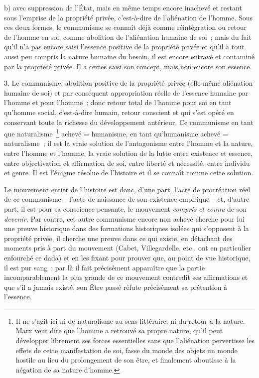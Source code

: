 \documentclass[french,twoside]{book} %
\begin{document}
b) avec suppression de l’État, mais en même temps encore inachevé et restant sous l’emprise de la propriété privée, c’est-à-dire de l’aliénation de l’homme. Sous ces deux formes, le communisme se connaît déjà comme réintégration ou retour de l’homme en soi, comme abolition de l’aliénation humaine de soi ; mais du fait qu’il n’a pas encore saisi l’essence positive de la propriété privée et qu’il a tout aussi peu compris la nature humaine du besoin, il est encore entravé et contaminé par la propriété privée. Il a certes saisi son concept, mais non encore son essence.\par
3. Le communisme, abolition positive de la propriété privée (elle-même aliénation humaine de soi) et par conséquent appropriation réelle de l’essence humaine par l’homme et pour l’homme ; donc retour total de l’homme pour soi en tant qu’homme social, c’est-à-dire humain, retour conscient et qui s’est opéré en conservant toute la richesse du développement antérieur. Ce communisme en tant que naturalisme \footnote{Il ne s’agit ici ni de naturalisme au sens littéraire, ni du retour à la nature. Marx veut dire que l’homme a retrouvé sa propre nature, qu’il peut développer librement ses forces essentielles sans que l’aliénation pervertisse les effets de cette manifestation de soi, fasse du monde des objets un monde hostile au lieu du prolongement de son être, et finalement aboutisse à la négation de sa nature d’homme.} achevé = humanisme, en tant qu’humanisme achevé = naturalisme ; il est la vraie solution de l’antagonisme entre l’homme et la nature, entre l’homme et l’homme, la vraie solution de la lutte entre existence et essence, entre objectivation et affirmation de soi, entre liberté et nécessité, entre individu et genre. Il est l’énigme résolue de l’histoire et il se connaît comme cette solution.\par
[V] Le mouvement entier de l’histoire est donc, d’une part, l’acte de procréation réel de ce communisme – l’acte de naissance de son existence empirique – et, d’autre part, il est pour sa conscience pensante, le mouvement \emph{compris et connu} de son \emph{devenir.} Par contre, cet autre communisme encore non achevé cherche pour lui une preuve historique dans des formations historiques isolées qui s’opposent à la propriété privée, il cherche une preuve dans ce qui existe, en détachant des moments pris à part du mouvement (Cabet, Villegardelle, etc., ont en particulier enfourché ce dada) et en les fixant pour prouver que, au point de vue historique, il est pur sang ; par là il fait précisément apparaître que la partie incomparablement la plus grande de ce mouvement contredit ses affirmations et que s’il a jamais existé, son Être passé réfute précisément sa prétention à l’essence.\par
\end{document}
